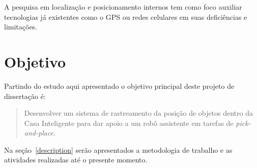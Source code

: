 A pesquisa em localização e posicionamento internos tem como foco auxiliar tecnologias já existentes como o GPS ou redes celulares em suas deficiências e limitações. %

\section{Objetivo}\label{goal}
Partindo do estudo aqui apresentado o objetivo principal deste projeto de dissertação é:

\begin{quote}
Desenvolver um sistema de rastreamento da posição de objetos dentro da Casa Inteligente para dar apoio a um robô assistente em tarefas de \textit{pick-and-place}.
\end{quote}

Na seção~\ref{description} serão apresentados a metodologia de trabalho e as atividades realizadas até o presente momento.

